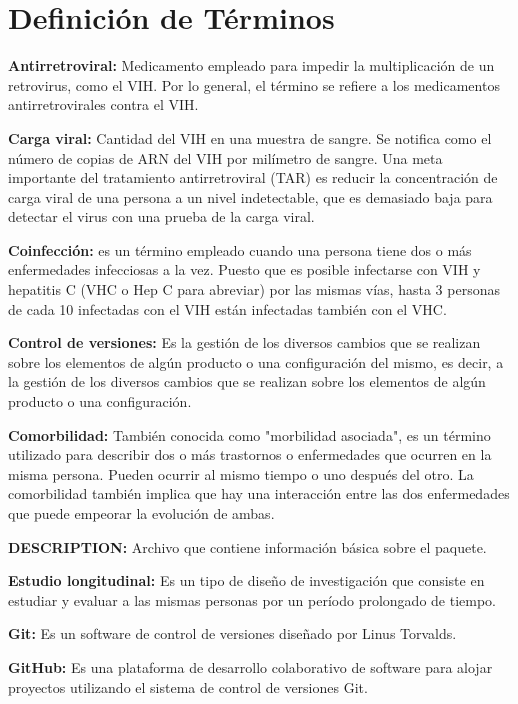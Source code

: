 \chapter{Definici\'on de T\'erminos}

\textbf{Antirretroviral: } Medicamento empleado para impedir la multiplicaci\'on de un retrovirus, como el VIH. Por lo general, el t\'ermino se refiere a los medicamentos antirretrovirales contra el VIH.

\textbf{Carga viral: } Cantidad del VIH en una muestra de sangre. Se notifica como el n\'umero de copias de ARN del VIH por mil\'imetro de sangre. Una meta importante del tratamiento antirretroviral (TAR) es reducir la concentraci\'on de carga viral de una persona a un nivel indetectable, que es demasiado baja para detectar el virus con una prueba de la carga viral.

\textbf{Coinfecci\'on: } es un t\'ermino empleado cuando una persona tiene dos o m\'as enfermedades infecciosas a la vez. Puesto que es posible infectarse con VIH y hepatitis C (VHC o Hep C para abreviar) por las mismas v\'ias,  hasta 3 personas de cada 10 infectadas con el VIH est\'an infectadas tambi\'en con el VHC.

\textbf{Control de versiones: } Es la gesti\'on de los diversos cambios que se realizan sobre los elementos de alg\'un producto o una configuraci\'on del mismo, es decir, a la gesti\'on de los diversos cambios que se realizan sobre los elementos de alg\'un producto o una configuraci\'on.

\textbf{Comorbilidad: } Tambi\'en conocida como "morbilidad asociada", es un t\'ermino utilizado para describir dos o m\'as trastornos o enfermedades que ocurren en la misma persona. Pueden ocurrir al mismo tiempo o uno despu\'es del otro. La comorbilidad tambi\'en implica que hay una interacci\'on entre las dos enfermedades que puede empeorar la evoluci\'on de ambas.

\textbf{DESCRIPTION: } Archivo que contiene informaci\'on b\'asica sobre el paquete.

\textbf{Estudio longitudinal:} Es un tipo de diseño de investigaci\'on que consiste en estudiar y evaluar a las mismas personas por un per\'iodo prolongado de tiempo.

\textbf{Git: } Es un software de control de versiones diseñado por Linus Torvalds.

\textbf{GitHub: } Es una plataforma de desarrollo colaborativo de software para alojar proyectos utilizando el sistema de control de versiones Git.

